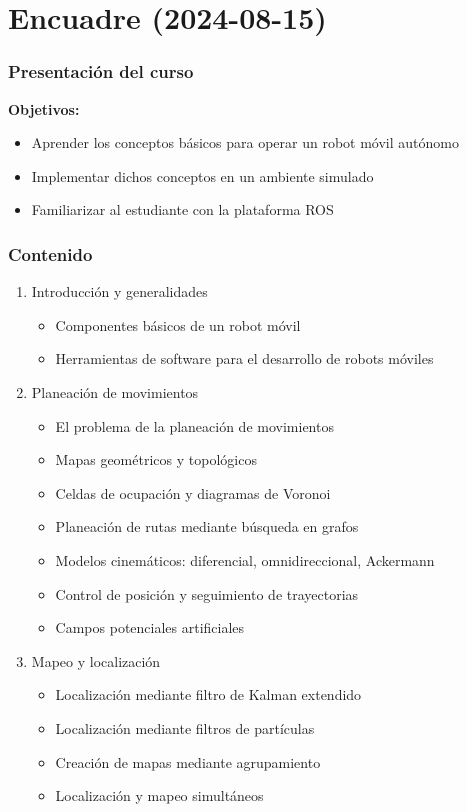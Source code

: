 \section{Encuadre (2024-08-15)}
\begin{frame}\frametitle{Presentación del curso}
  \textbf{Objetivos:}
  \begin{itemize}
  \item Aprender los conceptos básicos para operar un robot móvil autónomo
  \item Implementar dichos conceptos en un ambiente simulado
  \item Familiarizar al estudiante con la plataforma ROS
  \end{itemize}
\end{frame}

\begin{frame}\frametitle{Contenido}
  \begin{enumerate}
  \item Introducción y generalidades
    \begin{itemize}
    \item Componentes básicos de un robot móvil
    \item Herramientas de software para el desarrollo de robots móviles
    \end{itemize}
  \item Planeación de movimientos
    \begin{itemize}
    \item El problema de la planeación de movimientos
    \item Mapas geométricos y topológicos
    \item Celdas de ocupación y diagramas de Voronoi
    \item Planeación de rutas mediante búsqueda en grafos
    \item Modelos cinemáticos: diferencial, omnidireccional, Ackermann
    \item Control de posición y seguimiento de trayectorias
    \item Campos potenciales artificiales
    \end{itemize}
  \item Mapeo y localización
    \begin{itemize}
    \item Localización mediante filtro de Kalman extendido
    \item Localización mediante filtros de partículas
    \item Creación de mapas mediante agrupamiento
    \item Localización y mapeo simultáneos
    \end{itemize}
  \end{enumerate}
\end{frame}


